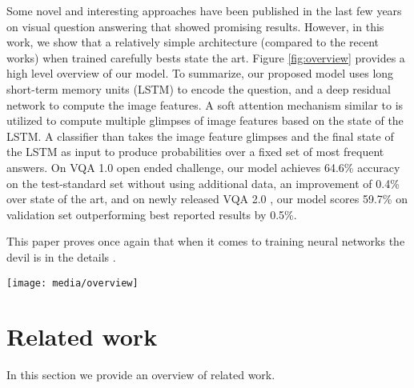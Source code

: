 \documentclass[10pt,twocolumn,letterpaper]{article}
\begin{document}
Some novel and interesting approaches \cite{Fukui2016MultimodalCB,Nam2016DualAN}  have been published in the last few years on visual question answering that showed promising results. However, in this work, we show that a relatively simple architecture (compared to the recent works) when trained carefully bests state the art. Figure \ref{fig:overview} provides a high level overview of our model. To summarize, our proposed model uses long short-term memory units (LSTM) \cite{Hochreiter1997LongSM} to encode the question, and a deep residual network \cite{He2016DeepRL} to compute the image features. A soft attention mechanism similar to \cite{Xu2015ShowAA} is utilized to compute multiple glimpses of image features based on the state of the LSTM. A classifier than takes the image feature glimpses and the final state of the LSTM as input to produce probabilities over a fixed set of most frequent answers. On VQA 1.0 \cite{Antol2015VQAVQ} open ended challenge, our model achieves 64.6\% accuracy on the test-standard set without using additional data, an improvement of 0.4\% over state of the art, and on newly released VQA 2.0 \cite{Goyal2016MakingTV}, our model scores 59.7\% on validation set outperforming best reported results by 0.5\%.

This paper proves once again that when it comes to training neural networks the devil is in the details \cite{Chatfield2014ReturnOT}.



\begin{figure*}
	\centering
	\texttt{[image: media/overview]}
	\caption{An overview of our model. We use a convolutional neural network based on ResNet \cite{He2016DeepRL} to embed the image.  The input question is tokenized and embedded and fed to a multi-layer LSTM. The concatenated image features and the final state of LSTMs are then used to compute multiple attention distributions over image features. The concatenated image feature glimpses and the state of the LSTM is fed to two fully connected layers two produce probabilities over answer classes. }
	\label{fig:overview}
\end{figure*}

\section{Related work}
In this section we provide an overview of related work.
\end{document}
